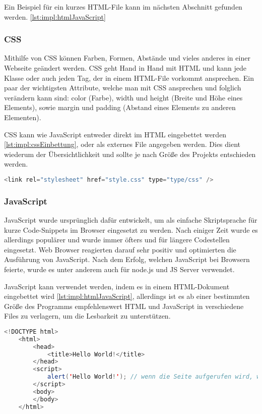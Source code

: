 Ein Beispiel für ein kurzes HTML-File kann im nächsten Abschnitt gefunden werden. \ref{lst:impl:htmlJavaScript}

\subsubsection{CSS}
Mithilfe von CSS können Farben, Formen, Abstände und vieles anderes in einer Webseite geändert werden. CSS geht Hand in Hand mit HTML und kann jede Klasse oder auch jeden Tag, der in einem HTML-File vorkommt ansprechen. Ein paar der wichtigsten Attribute, welche man mit CSS ansprechen und folglich verändern kann sind: color (Farbe), width und height (Breite und Höhe eines Elements), sowie margin und padding (Abstand eines Elements zu anderen Elementen).

CSS kann wie JavaScript entweder direkt im HTML eingebettet werden \ref{lst:impl:cssEinbettung}, oder als externes File angegeben werden. Dies dient wiederum der Übersichtlichkeit und sollte je nach Größe des Projekts entschieden werden. 

\begin{lstlisting}[language=java,caption=CSS Einbettung,label=lst:impl:cssEinbettung]
    <link rel="stylesheet" href="style.css" type="type/css" />
\end{lstlisting}

\subsubsection{JavaScript}
JavaScript wurde ursprünglich dafür entwickelt, um als einfache Skriptsprache für kurze Code-Snippets im Browser eingesetzt zu werden. Nach einiger Zeit wurde es allerdings populärer und wurde immer öfters und für längere Codestellen eingesetzt. Web Browser reagierten darauf sehr positiv und optimierten die Ausführung von JavaScript. Nach dem Erfolg, welchen JavaScript bei Browsern feierte, wurde es unter anderem auch für node.js und JS Server verwendet. 

JavaScript kann verwendet werden, indem es in einem HTML-Dokument eingebettet wird \ref{lst:impl:htmlJavaScript}, allerdings ist es ab einer bestimmten Größe des Programms empfehlenswert HTML und JavaScript in verschiedene Files zu verlagern, um die Lesbarkeit zu unterstützen. 

\begin{lstlisting}[language=java,caption=HTML mit eingebetteten JavaScript,label=lst:impl:htmlJavaScript]
    <!DOCTYPE html>
    <html>
        <head>
            <title>Hello World!</title>
        </head>
        <script>
            alert('Hello World!'); // wenn die Seite aufgerufen wird, wird mithilfe von JavaScript ein Alert-Fenster mit 'Hello World!' ausgegeben
        </script>
        <body>
        </body>
    </html>
\end{lstlisting}

